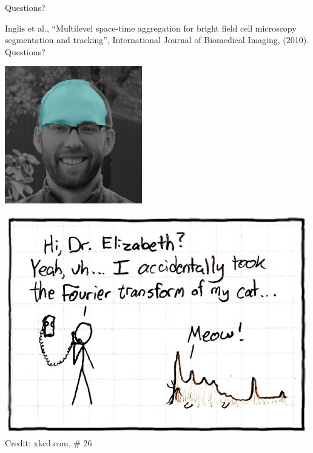 \documentclass[8pt]{beamer}
\begin{document}
\begin{frame}{Questions?}

   Inglis et al., ``Multilevel space-time aggregation for bright field cell microscopy segmentation and tracking'', International Journal of Biomedical Imaging, (2010).\\[1cm]

   Questions?\\[.5cm]

   \begin{minipage}{0.45\textwidth}
      \includegraphics[width=\textwidth]{ck_seg_blend_0001.png} \hspace{0.45cm}
   \end{minipage}
   \hspace{0.05\textwidth}
   \begin{minipage}{0.45\textwidth}
      \includegraphics[width=\textwidth]{xkcd_fourier.jpg}\\
      Credit: xkcd.com, \# 26
   \end{minipage}

\end{frame}
\end{document}

